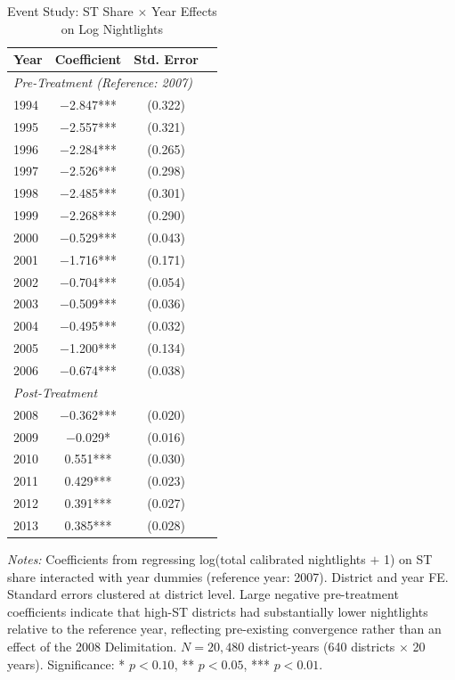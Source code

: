 \begin{table}[htbp]
\centering
\caption{Event Study: ST Share $\times$ Year Effects on Log Nightlights}\label{tab:event}
\small
\begin{threeparttable}
\begin{tabular}{lccc}
\toprule
Year & Coefficient & Std. Error & \\
\midrule
\multicolumn{4}{l}{\textit{Pre-Treatment (Reference: 2007)}} \\
1994 & $-$2.847*** & (0.322) & \\
1995 & $-$2.557*** & (0.321) & \\
1996 & $-$2.284*** & (0.265) & \\
1997 & $-$2.526*** & (0.298) & \\
1998 & $-$2.485*** & (0.301) & \\
1999 & $-$2.268*** & (0.290) & \\
2000 & $-$0.529*** & (0.043) & \\
2001 & $-$1.716*** & (0.171) & \\
2002 & $-$0.704*** & (0.054) & \\
2003 & $-$0.509*** & (0.036) & \\
2004 & $-$0.495*** & (0.032) & \\
2005 & $-$1.200*** & (0.134) & \\
2006 & $-$0.674*** & (0.038) & \\
\midrule
\multicolumn{4}{l}{\textit{Post-Treatment}} \\
2008 & $-$0.362*** & (0.020) & \\
2009 & $-$0.029* & (0.016) & \\
2010 & 0.551*** & (0.030) & \\
2011 & 0.429*** & (0.023) & \\
2012 & 0.391*** & (0.027) & \\
2013 & 0.385*** & (0.028) & \\
\bottomrule
\end{tabular}
\begin{tablenotes}\small
\item \textit{Notes:} Coefficients from regressing log(total calibrated nightlights $+$ 1) on ST share interacted with year dummies (reference year: 2007). District and year FE. Standard errors clustered at district level. Large negative pre-treatment coefficients indicate that high-ST districts had substantially lower nightlights relative to the reference year, reflecting pre-existing convergence rather than an effect of the 2008 Delimitation. $N = 20{,}480$ district-years (640 districts $\times$ 20 years). Significance: * $p<0.10$, ** $p<0.05$, *** $p<0.01$.
\end{tablenotes}
\end{threeparttable}
\end{table}
